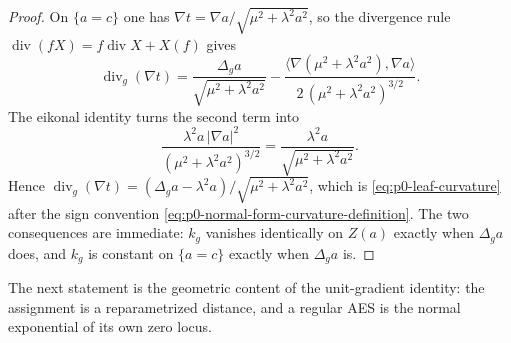 \begin{proof}
On $\{a=c\}$ one has $\nabla t=\nabla a/\sqrt{\mu^2+\lambda^2a^2}$, so the
divergence rule $\operatorname{div}(fX)=f\operatorname{div}X+X(f)$ gives
\[
 \operatorname{div}_g(\nabla t)
 =\frac{\Delta_ga}{\sqrt{\mu^2+\lambda^2a^2}}
  -\frac{\langle\nabla(\mu^2+\lambda^2a^2),\nabla a\rangle}
         {2\,(\mu^2+\lambda^2a^2)^{3/2}} .
\]
The eikonal identity turns the second term into
\[
 \frac{\lambda^2a\,|\nabla a|^2}{(\mu^2+\lambda^2a^2)^{3/2}}
 =\frac{\lambda^2a}{\sqrt{\mu^2+\lambda^2a^2}} .
\]
Hence $\operatorname{div}_g(\nabla t)=(\Delta_ga-\lambda^2a)/
\sqrt{\mu^2+\lambda^2a^2}$, which is \eqref{eq:p0-leaf-curvature} after the
sign convention \eqref{eq:p0-normal-form-curvature-definition}.  The two
consequences are immediate: $k_g$ vanishes identically on $Z(a)$ exactly when
$\Delta_ga$ does, and $k_g$ is constant on $\{a=c\}$ exactly when $\Delta_ga$
is.
\end{proof}

The next statement is the geometric content of the unit-gradient identity: the
assignment is a reparametrized distance, and a regular AES is the normal
exponential of its own zero locus.


